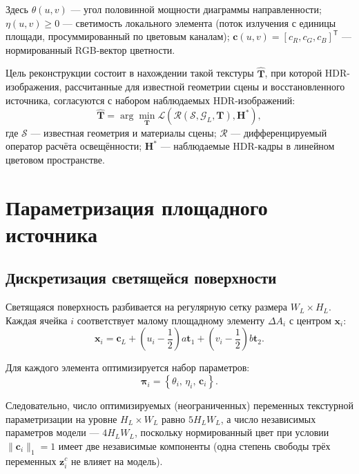 Здесь $\theta(u,v)$ --- угол половинной мощности диаграммы направленности; $\eta(u,v)\geq 0$ --- светимость локального элемента (поток излучения с единицы площади, просуммированный по цветовым каналам); $\mathbf{c}(u,v)=[c_R,c_G,c_B]^\mathsf{T}$ --- нормированный RGB-вектор цветности.

Цель реконструкции состоит в нахождении такой текстуры $\hat{\mathbf{T}}$, при которой HDR-изображения, рассчитанные для известной геометрии сцены и восстановленного источника, согласуются с набором наблюдаемых HDR-изображений:
\begin{equation}
\hat{\mathbf{T}}
=
\arg\min_{\mathbf{T}}
\mathcal{L}
\left(
\mathcal{R}(\mathcal{S},\mathcal{G}_L,\mathbf{T}),
\mathbf{H}^{\ast}
\right),
\end{equation}
где $\mathcal{S}$ --- известная геометрия и материалы сцены; $\mathcal{R}$ --- дифференцируемый оператор расчёта освещённости; $\mathbf{H}^{\ast}$ --- наблюдаемые HDR-кадры в линейном цветовом пространстве.

\section{Параметризация площадного источника}

\subsection{Дискретизация светящейся поверхности}

Светящаяся поверхность разбивается на регулярную сетку размера $W_L\times H_L$. Каждая ячейка $i$ соответствует малому площадному элементу $\Delta A_i$ с центром $\mathbf{x}_i$:
\begin{equation}
\mathbf{x}_i
=
\mathbf{c}_L
+
\left(u_i-\frac{1}{2}\right)a\mathbf{t}_1
+
\left(v_i-\frac{1}{2}\right)b\mathbf{t}_2.
\end{equation}

Для каждого элемента оптимизируется набор параметров:
\begin{equation}
\boldsymbol{\pi}_i=
\left\{
\theta_i,\,
\eta_i,\,
\mathbf{c}_i
\right\}.
\end{equation}

Следовательно, число оптимизируемых (неограниченных) переменных текстурной параметризации на уровне $H_L\times W_L$ равно $5H_LW_L$, а число независимых параметров модели --- $4H_LW_L$, поскольку нормированный цвет при условии $\|\mathbf{c}_i\|_1=1$ имеет две независимые компоненты (одна степень свободы трёх переменных $\mathbf{z}_i^c$ не влияет на модель).

